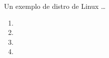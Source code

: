 \note{       }




\begin{frame}{Un exemplo de distro de Linux \dots}
\begin{enumerate}
\item  \pause
\item \pause
\item  \pause
\item        \pause
\end{enumerate} 
\end{frame}














